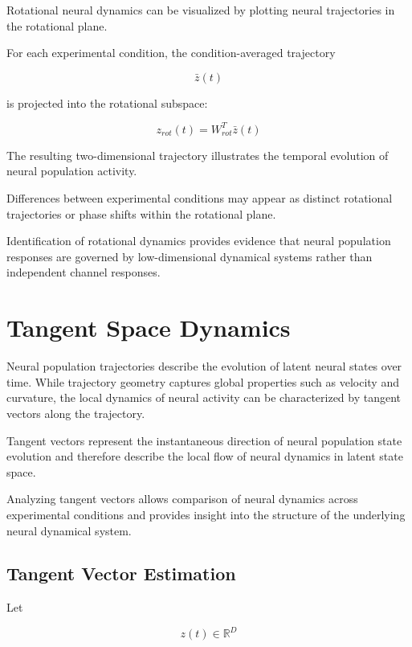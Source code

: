 \documentclass[11pt]{report}
\begin{document}
Rotational neural dynamics can be visualized by plotting neural
trajectories in the rotational plane.

For each experimental condition, the condition-averaged trajectory

\begin{equation}
\bar{z}(t)
\end{equation}

is projected into the rotational subspace:

\begin{equation}
z_{rot}(t) = W_{rot}^{T} \bar{z}(t)
\end{equation}

The resulting two-dimensional trajectory illustrates the temporal
evolution of neural population activity.

Differences between experimental conditions may appear as distinct
rotational trajectories or phase shifts within the rotational
plane.

Identification of rotational dynamics provides evidence that
neural population responses are governed by low-dimensional
dynamical systems rather than independent channel responses.


\chapter{Tangent Space Dynamics}

Neural population trajectories describe the evolution of latent neural
states over time. While trajectory geometry captures global properties
such as velocity and curvature, the local dynamics of neural activity
can be characterized by tangent vectors along the trajectory.

Tangent vectors represent the instantaneous direction of neural
population state evolution and therefore describe the local flow of
neural dynamics in latent state space.

Analyzing tangent vectors allows comparison of neural dynamics across
experimental conditions and provides insight into the structure of the
underlying neural dynamical system.

\section{Tangent Vector Estimation}

Let

\begin{equation}
z(t) \in \mathbb{R}^{D}
\end{equation}
\end{document}
